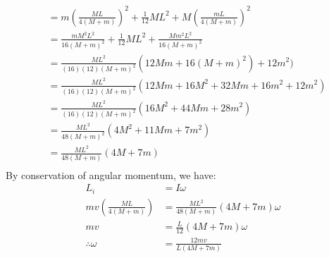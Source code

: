 \begin{solution}
\begin{align*}
&=m\left(\frac{ML}{4(M+m)}\right)^2+\frac{1}{12}ML^2+M\left( \frac{mL}{4(M+m)}\right)^2\\
&=\frac{mM^2L^2}{16(M+m)^2}+\frac{1}{12}ML^2+\frac{Mm^2L^2}{16(M+m)^2}\\
&=\frac{ML^2}{(16)(12)(M+m)^2} (12Mm+16(M+m)^2)+12m^2)\\ 
&=\frac{ML^2}{(16)(12)(M+m)^2} (12Mm+16M^2+32Mm+16m^2+12m^2)\\ 
&=\frac{ML^2}{(16)(12)(M+m)^2} (16M^2+44Mm+28m^2)\\ 
&=\frac{ML^2}{48(M+m)^2} (4M^2+11Mm+7m^2)\\ 
&=\frac{ML^2}{48(M+m)} (4M+7m)\\ 
\end{align*}
By conservation of angular momentum, we have:
\begin{align*}
L_i &= I\omega\\
mv\left(\frac{ML}{4(M+m)}\right) &=\frac{ML^2}{48(M+m)} (4M+7m)\omega\\
mv &=\frac{L}{12}(4M+7m)\omega\\
\therefore \omega &=\frac{12mv}{L(4M+7m)}
\end{align*}
\end{solution}


